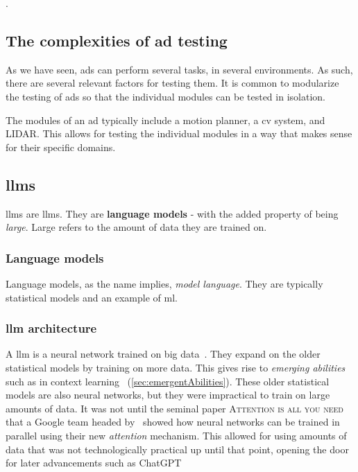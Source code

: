 

.

\subsection*{The complexities of \acrshort{ad} testing}\label{sec:adsTestingComplexity}

As we have seen, \acrshort{ads} can perform several tasks, in several environments. As such, there
are several relevant factors for testing them. It is common to modularize the testing of
\acrshort{ads} so that the individual modules can be tested in isolation.

The modules of an \acrshort{ad} typically include a motion planner, a \acrfull{cv} system, and
LIDAR. This allows for testing the individual modules in a way that makes sense for their specific
domains.


\subsection{\acrfull{llms}}

\acrfull{llms} are \acrlong{llms}. They are \textbf{language models} - with the added property of
being \textit{large}. Large refers to the amount of data they are trained on.

\subsubsection{Language models}


Language models, as the name implies, \textit{model language}. They are typically statistical models
and an example of \acrfull{ml}.

\subsubsection{\acrfull{llm} architecture}\label{sec:llmArch}

A \acrlong{llm} is a neural network trained on big
data~\cite[3]{llmSurvey}. They expand on the older statistical models by
training on more data. This gives rise to \textit{emerging abilities} such as in
context learning~\cite[3]{llmSurvey} (\cref{sec:emergentAbilities}). These older statistical models are also
neural networks, but they were impractical to train on large amounts of data. It
was not until the seminal paper \textsc{Attention is all you
    need}~\cite{attentionIsAllYouNeed} that a Google team headed by~\citeauthor{attentionIsAllYouNeed} showed how neural networks
can be trained in parallel using their new \textit{attention} mechanism. This
allowed for using amounts of data that was not technologically practical up
until that point, opening the door for later advancements such as
ChatGPT~\cite[9]{llmSurvey}

